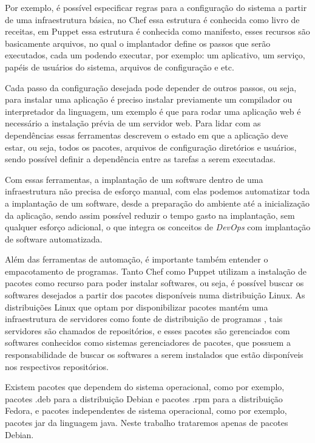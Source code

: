 Por exemplo, é possível especificar regras para a configuração do sistema
a partir de uma infraestrutura básica, no Chef essa estrutura é conhecida como livro
de receitas, em Puppet essa estrutura é conhecida como manifesto, esses recursos
são basicamente arquivos, no qual o implantador define os passos que serão executados,
cada um podendo executar, por exemplo: um aplicativo, um serviço, papéis de usuários do sistema,
arquivos de configuração e etc.

Cada passo da configuração desejada pode depender de outros passos, ou seja, para
instalar uma aplicação é preciso instalar previamente um compilador ou interpretador
 da linguagem, um exemplo é que para rodar uma aplicação web é necessário a 
instalação prévia de um servidor web. Para lidar com as dependências essas 
ferramentas descrevem o estado em que a aplicação deve estar, ou seja, 
todos os pacotes, arquivos de configuração diretórios e usuários, sendo possível 
definir a dependência entre as tarefas a serem executadas.

Com essas ferramentas, a implantação de um software dentro de uma infraestrutura
não precisa de  esforço manual, com elas podemos automatizar toda a implantação
de um software, desde a preparação do ambiente até a inicialização da aplicação,
sendo assim possível reduzir o tempo gasto na implantação, sem qualquer esforço
adicional, o que integra os conceitos de \textit{DevOps} com implantação de 
software automatizada.

Além das ferramentas de automação, é importante também entender o empacotamento de
programas. Tanto Chef como Puppet utilizam a instalação de pacotes como recurso para
poder instalar softwares, ou seja, é possível buscar os softwares desejados a partir
dos pacotes disponíveis numa distribuição Linux. As distribuições Linux que
optam por disponibilizar pacotes mantém uma infraestrutura de servidores como fonte
de distribuição de programas \cite{araujo2011apprecommender}, tais servidores são
chamados de repositórios, e esses pacotes são gerenciados com softwares conhecidos
como sistemas gerenciadores de pacotes, que possuem a responsabilidade de buscar
os softwares a serem instalados que estão disponíveis nos respectivos repositórios.

Existem pacotes que dependem do sistema operacional, como por exemplo, pacotes .deb
para a distribuição Debian e pacotes .rpm para a distribuição Fedora, e
pacotes independentes de sistema operacional, como por exemplo, pacotes jar da
linguagem java. Neste trabalho trataremos apenas de pacotes Debian.


